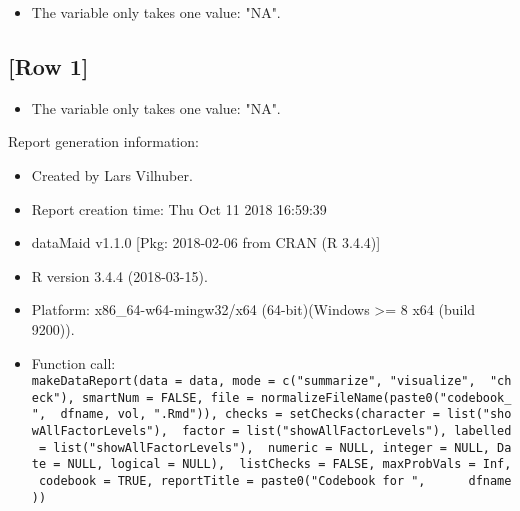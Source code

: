 \documentclass[]{article}
\providecommand{\tightlist}{%
  \setlength{\itemsep}{0pt}\setlength{\parskip}{0pt}}
\newcommand{\fullline}{\noindent\makebox[\linewidth]{\rule{\textwidth}{0.4pt}}}
\begin{document}
\begin{itemize}
\tightlist
\item
  The variable only takes one value: "NA".
\end{itemize}

\fullline

\hypertarget{row-1}{\subsection{{[}Row 1{]}}\label{row-1}}

\begin{itemize}
\tightlist
\item
  The variable only takes one value: "NA".
\end{itemize}

\fullline

Report generation information:

\begin{itemize}
\item
  Created by Lars Vilhuber.
\item
  Report creation time: Thu Oct 11 2018 16:59:39
\item
  dataMaid v1.1.0 {[}Pkg: 2018-02-06 from CRAN (R 3.4.4){]}
\item
  R version 3.4.4 (2018-03-15).
\item
  Platform: x86\_64-w64-mingw32/x64 (64-bit)(Windows \textgreater{}= 8
  x64 (build 9200)).
\item
  Function call:
  \texttt{makeDataReport(data\ =\ data,\ mode\ =\ c("summarize",\ "visualize",\ \ "check"),\ smartNum\ =\ FALSE,\ file\ =\ normalizeFileName(paste0("codebook\_",\ \ dfname,\ vol,\ ".Rmd")),\ checks\ =\ setChecks(character\ =\ list("showAllFactorLevels"),\ \ factor\ =\ list("showAllFactorLevels"),\ labelled\ =\ list("showAllFactorLevels"),\ \ numeric\ =\ NULL,\ integer\ =\ NULL,\ Date\ =\ NULL,\ logical\ =\ NULL),\ \ listChecks\ =\ FALSE,\ maxProbVals\ =\ Inf,\ codebook\ =\ TRUE,\ reportTitle\ =\ paste0("Codebook\ for\ ",\ \ \ \ \ \ dfname))}
\end{itemize}
\end{document}
